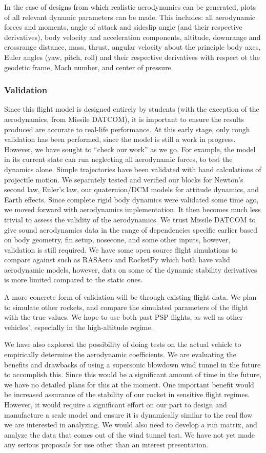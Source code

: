 In the case of designs from which realistic aerodynamics can be generated, plots of all relevant dynamic parameters can be made. This includes: all aerodynamic forces and moments, angle of attack and sideslip angle (and their respective derivatives), body velocity and acceleration components, altitude, downrange and crossrange distance, mass, thrust, angular velocity about the principle body axes, Euler angles (yaw, pitch, roll) and their respective derivatives with respect ot the geodetic frame, Mach number, and center of pressure.

\subsubsection{Validation}
Since this flight model is designed entirely by students (with the exception of the aerodynamics, from Missile DATCOM), it is important to ensure the results produced are accurate to real-life performance. At this early stage, only rough validation has been performed, since the model is still a work in progress. However, we have sought to ``check our work'' as we go. For example, the model in its current state can run neglecting all aerodynamic forces, to test the dynamics alone. Simple trajectories have been validated with hand calculations of projectile motion. We separately tested and verified our blocks for Newton's second law, Euler’s law, our quaternion/DCM models for attitude dynamics, and Earth effects. Since complete rigid body dynamics were validated some time ago, we moved forward with aerodynamics implementation. It then becomes much less trivial to assess the validity of the aerodynamics. We trust Missile DATCOM to give sound aerodynamics data in the range of dependencies specific earlier based on body geometry, fin setup, nosecone, and some other inputs, however, validation is still required. We have some open source flight simulations to compare against such as RASAero and RocketPy which both have valid aerodynamic models, however, data on some of the dynamic stability derivatives is more limited compared to the static ones.

A more concrete form of validation will be through existing flight data. We plan to simulate other rockets, and compare the simulated parameters of the flight with the true values. We hope to use both past PSP flights, as well as other vehicles', especially in the high-altitude regime. 

We have also explored the possibility of doing tests on the actual vehicle to empirically determine the aerodynamic coefficients. We are evaluating the benefits and drawbacks of using a supersonic blowdown wind tunnel in the future to accomplish this. Since this would be a significant amount of time in the future, we have no detailed plans for this at the moment. One important benefit would be increased assurance of the stability of our rocket in sensitive flight regimes. However, it would require a significant effort on our part to design and manufacture a scale model and ensure it is dynamically similar to the real flow we are interested in analyzing. We would also need to develop a run matrix, and analyze the data that comes out of the wind tunnel test. We have not yet made any serious proposals for use other than an interest presentation.


